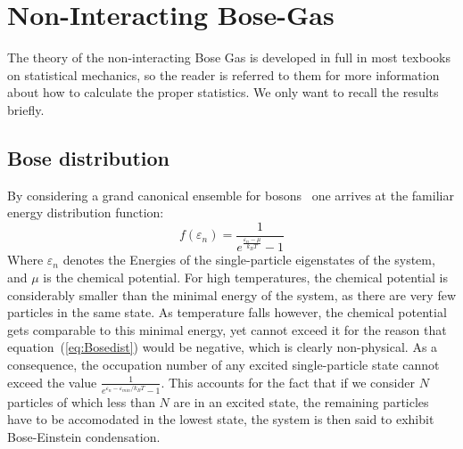 
\section{Non-Interacting Bose-Gas}
The theory of the non-interacting Bose Gas is developed in full in most texbooks on statistical mechanics, 
so the reader is referred to them for more information about how to calculate the proper statistics. We only want to 
recall the results briefly.

\subsection{Bose distribution}
By considering a grand canonical ensemble for bosons~\cite{huang}
one arrives at the familiar energy  distribution function:
\begin{equation}\label{eq:Bosedist}
	f(\varepsilon_{n})=\frac{1}{e^{\frac{\varepsilon_n-\mu}{k_BT}}-1}
\end{equation}
Where $\varepsilon_n$ denotes the Energies of the single-particle eigenstates of the system, and $\mu$ is the chemical 
potential. For high temperatures, 
the chemical potential is considerably smaller than the minimal energy of the system, 
as there are very few particles in the same state. As temperature
falls however, the chemical potential gets comparable to this minimal energy, yet cannot exceed it for the reason that 
equation~(\ref{eq:Bosedist}) would 
be negative, which is clearly non-physical. As a consequence, the occupation number of any excited single-particle 
state cannot exceed the value 
$\frac{1}{e^{\varepsilon_n-\varepsilon_{min}/k_BT}-1}$. This accounts for the fact that if we consider $N$ particles
of which less than $N$ are in an excited state, the remaining particles have to be accomodated in the lowest state, 
the system is then said to exhibit Bose-Einstein
condensation.

